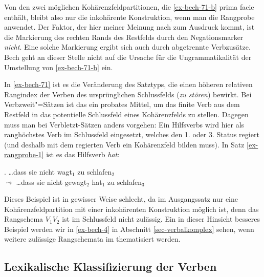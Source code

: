 Von den zwei möglichen Kohärenzfeldpartitionen, die \ref{ex-bech-71-b} prima facie enthält, bleibt also nur die inkohärente Konstruktion, wenn man die Rangprobe anwendet. Der Faktor, der hier meiner Meinung nach zum Ausdruck kommt, ist die Markierung des rechten Rands des Restfelds durch den Negationsmarker {\it nicht}. Eine solche Markierung ergibt sich auch durch abgetrennte Verbzusätze. Bech geht an dieser Stelle nicht auf die Ursache für die Ungrammatikalität der Umstellung von \ref{ex-bech-71-b} ein.

In \ref{ex-bech-71} ist es die Veränderung des Satztyps, die einen höheren relativen Rangindex der Verben des ursprünglichen Schlussfelds ({\it zu stören}) bewirkt. Bei Verbzweit"=Sätzen ist das ein probates Mittel, um das finite Verb aus dem Restfeld in das potentielle Schlussfeld eines Kohärenzfelds zu stellen. Dagegen muss man bei Verbletzt-Sätzen anders vorgehen: Ein Hilfsverbs wird hier als ranghöchstes Verb im Schlussfeld eingesetzt, welches den 1. oder 3. Status regiert (und deshalb mit dem regierten Verb ein Kohärenzfeld bilden muss). In Satz \ref{ex-rangprobe-1} ist es das Hilfsverb {\it hat}:

\ex. \label{ex-rangprobe-1}\ldots dass sie nicht wagt$_1$ zu schlafen$_2$ \\
$\leadsto$ \ldots dass sie nicht gewagt$_2$ hat$_1$ zu schlafen$_3$

Dieses Beispiel ist in gewisser Weise schlecht, da im Ausgangssatz nur eine Kohärenzfeldpartition mit einer inkohärenten Konstruktion möglich ist, denn das Rangschema $V_1 V_2$ ist im Schlussfeld nicht zulässig. Ein in dieser Hinsicht besseres Beispiel werden wir in \ref{ex-bech-4} in Abschnitt \ref{sec-verbalkomplex} sehen, wenn weitere zulässige Rangschemata im  thematisiert werden.



\subsection{Lexikalische Klassifizierung der Verben}

